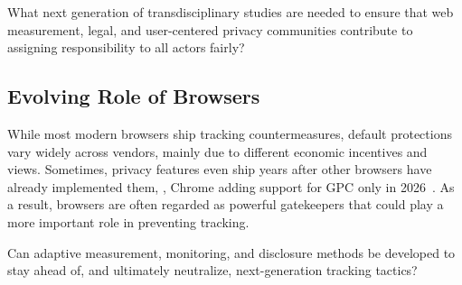 \begin{opbox}
What next generation of transdisciplinary studies are needed to ensure that web measurement, legal, and user-centered privacy communities contribute to assigning responsibility to all actors fairly?
\end{opbox}



\subsection{Evolving Role of Browsers}

% 
While most modern browsers ship tracking countermeasures, default protections vary widely across vendors, mainly due to different economic incentives and views. Sometimes, privacy features even ship years after other browsers have already implemented them, \eg{}, Chrome adding support for GPC only in 2026~\cite{googleGlobalPrivacyControl2025}.
% 
As a result, browsers are often regarded as powerful gatekeepers that could play a more important role in preventing tracking.

\begin{opbox}
Can adaptive measurement, monitoring, and disclosure methods be developed to stay ahead of, and ultimately neutralize, next-generation tracking tactics?
\end{opbox}


